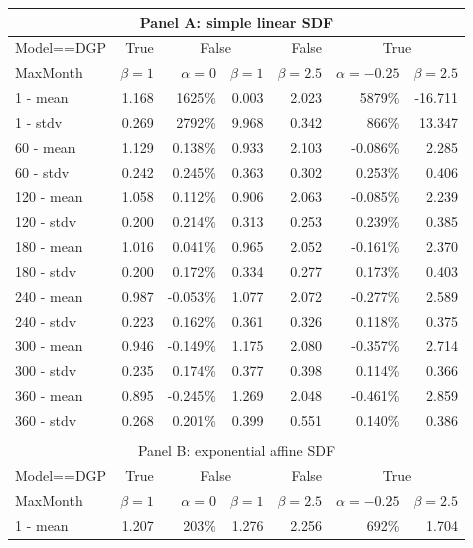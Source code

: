 \documentclass[12pt]{article}
\begin{document}
\begin{table}[ht]
	\centering
	\begin{tabular}{lrrrrrr}
		\multicolumn{7}{c}{Panel A: simple linear SDF} \\
		\hline
		Model==DGP & True & \multicolumn{2}{c}{False} & False & \multicolumn{2}{c}{True} \\
		MaxMonth & $\beta=1$ & $\alpha=0$ & $\beta=1$ & $\beta=2.5$ & $\alpha=-0.25$ & $\beta=2.5$ \\ 
		\hline
		\hline
		1 - mean & 1.168 & 1625\% & 0.003 & 2.023 & 5879\% & -16.711 \\ 
		1 - stdv & 0.269 & 2792\% & 9.968 & 0.342 & 866\% & 13.347 \\ 
		\hline
		60 - mean & 1.129 & 0.138\% & 0.933 & 2.103 & -0.086\% & 2.285 \\ 
		60 - stdv & 0.242 & 0.245\% & 0.363 & 0.302 & 0.253\% & 0.406 \\ 
		\hline
		120 - mean & 1.058 & 0.112\% & 0.906 & 2.063 & -0.085\% & 2.239 \\ 
		120 - stdv & 0.200 & 0.214\% & 0.313 & 0.253 & 0.239\% & 0.385 \\ 
		\hline
		180 - mean & 1.016 & 0.041\% & 0.965 & 2.052 & -0.161\% & 2.370 \\ 
		180 - stdv & 0.200 & 0.172\% & 0.334 & 0.277 & 0.173\% & 0.403 \\ 
		\hline
		240 - mean & 0.987 & -0.053\% & 1.077 & 2.072 & -0.277\% & 2.589 \\ 
		240 - stdv & 0.223 & 0.162\% & 0.361 & 0.326 & 0.118\% & 0.375 \\
		\hline 
		300 - mean & 0.946 & -0.149\% & 1.175 & 2.080 & -0.357\% & 2.714 \\ 
		300 - stdv & 0.235 & 0.174\% & 0.377 & 0.398 & 0.114\% & 0.366 \\ 
		\hline
		360 - mean & 0.895 & -0.245\% & 1.269 & 2.048 & -0.461\% & 2.859 \\ 
		360 - stdv & 0.268 & 0.201\% & 0.399 & 0.551 & 0.140\% & 0.386 \\ 
		\hline
		\hline
		\multicolumn{7}{l}{} \\
		\multicolumn{7}{c}{Panel B: exponential affine SDF} \\
		\hline
		Model==DGP & True & \multicolumn{2}{c}{False} & False & \multicolumn{2}{c}{True} \\
		MaxMonth & $\beta=1$ & $\alpha=0$ & $\beta=1$ & $\beta=2.5$ & $\alpha=-0.25$ & $\beta=2.5$ \\ 
		\hline
		\hline
		1 - mean & 1.207 & 203\% & 1.276 & 2.256 & 692\% & 1.704 \\ 

\end{tabular}
\end{table}
\end{document}
